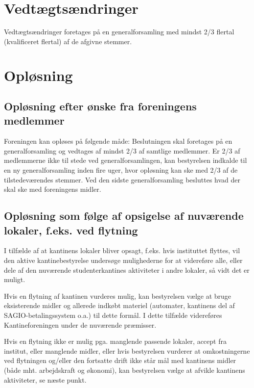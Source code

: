 \documentclass[a4paper, 10pt]{article}
\begin{document}
\section{Vedtægtsændringer}

Vedtægtsændringer foretages på en generalforsamling med mindst 2/3
flertal (kvalificeret flertal) af de afgivne stemmer.

\section{Opløsning}

\subsection*{Opløsning efter ønske fra foreningens medlemmer}

Foreningen kan opløses på følgende måde: Beslutningen skal foretages
på en generalforsamling og vedtages af mindst 2/3 af samtlige
medlemmer. Er 2/3 af medlemmerne ikke til stede ved
generalforsamlingen, kan bestyrelsen indkalde til en ny
generalforsamling inden fire uger, hvor opløsning kan ske med 2/3 af
de tilstedeværendes stemmer. Ved den sidste generalforsamling
besluttes hvad der skal ske med foreningens midler.

\subsection*{Opløsning som følge af opsigelse af nuværende lokaler,
f.eks. ved flytning}

I tilfælde af at kantinens lokaler bliver opsagt, f.eks. hvis
instituttet flyttes, vil den aktive kantinebestyrelse undersøge
mulighederne for at videreføre alle, eller dele af den nuværende
studenterkantines aktiviteter i andre lokaler, så vidt det er muligt.

Hvis en flytning af kantinen vurderes mulig, kan bestyrelsen vælge at
bruge eksisterende midler og allerede indkøbt materiel (automater,
kantinens del af SAGIO-betalingssystem o.a.) til dette formål. I dette
tilfælde videreføres Kantineforeningen under de nuværende præmisser.

Hvis en flytning ikke er mulig pga. manglende passende lokaler, accept
fra institut, eller manglende midler, eller hvis bestyrelsen vurderer
at omkostningerne ved flytningen og/eller den fortsatte drift ikke
står mål med kantinens midler (både mht.  arbejdskraft og økonomi),
kan bestyrelsen vælge at afvikle kantinens aktiviteter, se næste
punkt.
\end{document}
